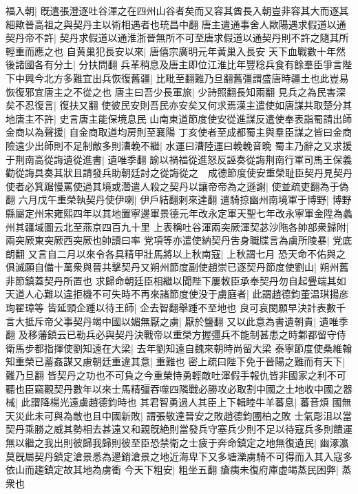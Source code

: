 福入朝|{
	旣遣張澄逐吐谷渾之在四州山谷者矣而又容其酋長入朝豈非容其大而逐其細歟晉高祖之與契丹主以術相遇者也珫昌中翻}
唐主遣通事舍人歐陽遇求假道以通契丹帝不許|{
	契丹求假道以通淮浙晉無所不可至唐求假道以通契丹則不許之隨其所輕重而應之也}
自黄巢犯長安以來|{
	唐僖宗廣明元年黃巢入長安}
天下血戰數十年然後諸國各有分土|{
	分扶問翻}
兵革稍息及唐主即位江淮比年豐稔兵食有餘羣臣爭言陛下中興今北方多難宜出兵恢復舊疆|{
	比毗至翻難乃旦翻舊彊謂盛唐時疆土也此豈易恢復邪宜唐主之不從之也}
唐主曰吾少長軍旅|{
	少詩照翻長知兩翻}
見兵之為民害深矣不忍復言|{
	復扶又翻}
使彼民安則吾民亦安矣又何求焉漢主遣使如唐謀共取楚分其地唐主不許|{
	史言唐主能保境息民}
山南東道節度使安從進謀反遣使奉表詣蜀請出師金商以為聲援|{
	自金商取道均房則至襄陽}
丁亥使者至成都蜀主與羣臣謀之皆曰金商險遠少出師則不足制敵多則漕輓不繼|{
	水運曰漕陸運曰輓輓音晩}
蜀主乃辭之又求援于荆南高從誨遺從進書|{
	遺唯季翻}
諭以禍福從進怒反誣奏從誨荆南行軍司馬王保義勸從誨具奏其狀且請發兵助朝廷討之從誨從之　成德節度使安重榮耻臣契丹見契丹使者必箕踞慢罵使過其境或濳遣人殺之契丹以讓帝帝為之遜謝|{
	使並疏吏翻為于偽翻}
六月戊午重榮執契丹使伊喇|{
	伊戶結翻剌來達翻}
遣騎掠幽州南境軍于博野|{
	博野縣屬定州宋雍熙四年以其地置寧邊軍景德元年改永定軍天聖七年改永寧軍金陞為蠡州其疆域圖云北至燕京四百九十里}
上表稱吐谷渾兩突厥渾契苾沙陁各帥部衆歸附|{
	兩突厥東突厥西突厥也帥讀曰率}
党項等亦遣使納契丹吿身職牒言為虜所陵暴|{
	党底朗翻}
又言自二月以來令各具精甲壯馬將以上秋南寇|{
	上秋謂七月}
恐天命不佑與之俱滅願自備十萬衆與晉共擊契丹又朔州節度副使趙崇已逐契丹節度使劉山|{
	朔州舊非節鎮蓋契丹所置也}
求歸命朝廷臣相繼以聞陛下屢敇臣承奉契丹勿自起舋端其如天道人心難以違拒機不可失時不再來諸節度使没于虜庭者|{
	此謂趙德鈞董温琪揚彦珣翟璋等}
皆延頸企踵以待王師|{
	企去智翻舉踵不至地也}
良可哀閔願早決計表數千言大抵斥帝父事契丹竭中國以媚無厭之虜|{
	厭於鹽翻}
又以此意為書遺朝貴|{
	遺唯季翻}
及移藩鎮云已勒兵必與契丹決戰帝以重榮方握彊兵不能制甚患之時鄴都留守侍衛馬步都指揮使劉知遠在大梁|{
	去年劉知遠自魏來朝時尚留大梁}
泰寧節度使桑維翰知重榮已蓄姦謀又慮朝廷重違其意|{
	重難也}
密上疏曰陛下免于晉陽之難而有天下|{
	難乃旦翻}
皆契丹之功也不可負之今重榮恃勇輕敵吐渾假手報仇皆非國家之利不可聽也臣竊觀契丹數年以來士馬精彊吞噬四隣戰必勝攻必取割中國之土地收中國之器械|{
	此謂降楊光遠虜趙德鈞時也}
其君智勇過人其臣上下輯睦牛羊蕃息|{
	蕃音煩}
國無天災此未可與為敵也且中國新敗|{
	謂張敬達晉安之敗趙德鈞圑柏之敗}
士氣彫沮以當契丹乘勝之威其勢相去甚遠又和親旣絶則當發兵守塞兵少則不足以待寇兵多則饋運無以繼之我出則彼歸我歸則彼至臣恐禁衛之士疲于奔命鎮定之地無復遺民|{
	幽涿瀛莫旣屬契丹鎮定滄景悉為邊銷滄景之地近海卑下又多塘濼虜騎不可得而入其入寇多依山而趨鎮定故其地為虜衝}
今天下粗安|{
	粗坐五翻}
瘡痍未復府庫虚竭蒸民困弊|{
	蒸衆也}
